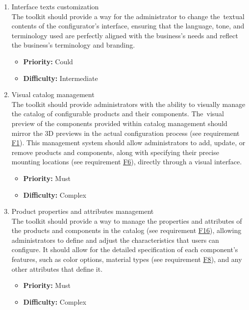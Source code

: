 \begin{enumerate}[label=\textbf{F\arabic*:}, leftmargin=30pt]
\item \label{itm:F15} Interface texts customization
\vspace{2pt}
\\The toolkit should provide a way for the administrator to change the~textual contents of the configurator's interface, ensuring that the language, tone, and terminology used are perfectly aligned with the business's \phantom{needs and reflect the business's terminology and branding.}\newpage needs and reflect the business's terminology and branding.
\begin{itemize}[noitemsep, label=\trianglebullet]
    \item \textbf{Priority:} Could
    \item \textbf{Difficulty:} Intermediate
\end{itemize}
\vspace{4pt}

\item \label{itm:F16} Visual catalog management
\vspace{2pt}
\\The toolkit should provide administrators with the ability to visually manage the catalog of configurable products and their components. The~visual preview of the components provided within catalog management should mirror the 3D previews in the actual configuration process (see requirement \hyperref[itm:F1]{F1}). This management system should allow administrators to add, update, or remove products and components, along with specifying their precise mounting locations (see requirement \hyperref[itm:F6]{F6}), directly through a visual interface.
\begin{itemize}[noitemsep, label=\trianglebullet]
    \item \textbf{Priority:} Must
    \item \textbf{Difficulty:} Complex
\end{itemize}
\vspace{4pt}

\item \label{itm:F17} Product properties and attributes management
\vspace{2pt}
\\The toolkit should provide a way to manage the properties and attributes of the products and components in the catalog (see requirement \hyperref[itm:F16]{F16}), allowing administrators to define and adjust the characteristics that users can configure. It should allow for the detailed specification of each component's features, such as color options, material types (see requirement \hyperref[itm:F8]{F8}), and any other attributes that define it.
\begin{itemize}[noitemsep, label=\trianglebullet]
    \item \textbf{Priority:} Must
    \item \textbf{Difficulty:} Complex
\end{itemize}
\vspace{4pt}



\end{enumerate}

